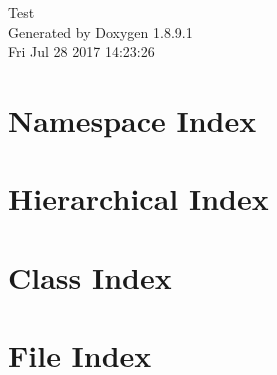 \documentclass[twoside]{book}
\newcommand{\+}{\discretionary{\mbox{\scriptsize$\hookleftarrow$}}{}{}}
\newcommand{\clearemptydoublepage}{%
  \newpage{\pagestyle{empty}\cleardoublepage}%
}
\begin{document}
\hypersetup{pageanchor=false,
             bookmarks=true,
             bookmarksnumbered=true,
             pdfencoding=unicode
            }
\begin{titlepage}
\vspace*{7cm}
\begin{center}%
{\Large Test }\\
\vspace*{1cm}
{\large Generated by Doxygen 1.8.9.1}\\
\vspace*{0.5cm}
{\small Fri Jul 28 2017 14:23:26}\\
\end{center}
\end{titlepage}
\clearemptydoublepage
\tableofcontents
\clearemptydoublepage
{}
\hypersetup{pageanchor=true}

\chapter{Namespace Index}

\chapter{Hierarchical Index}

\chapter{Class Index}

\chapter{File Index}

\end{document}
